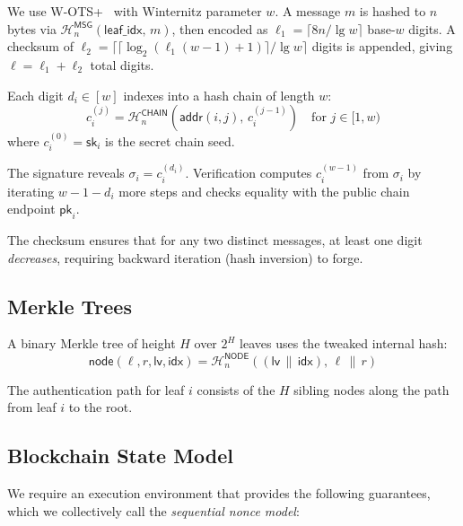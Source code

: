 \documentclass[11pt]{article}
\newcommand{\hash}{\mathcal{H}}
\newcommand{\concat}{\,\|\,}
\begin{document}
We use W-OTS+~\cite{wots} with Winternitz parameter $w$. A message $m$
is hashed to $n$ bytes via
$\hash_n^{\mathsf{MSG}}(\mathsf{leaf\_idx},\, m)$, then encoded as
$\ell_1 = \lceil 8n / \lg w
\rceil$ base-$w$ digits. A checksum of $\ell_2 = \lceil \lceil
\log_2(\ell_1(w-1) + 1) \rceil / \lg w \rceil$ digits is appended,
giving $\ell = \ell_1 + \ell_2$ total digits.

Each digit $d_i \in [w]$ indexes into a hash chain of length $w$:
\[
c_i^{(j)} = \hash_n^{\mathsf{CHAIN}}(\mathsf{addr}(i, j),\, c_i^{(j-1)})
\quad\text{for } j \in [1, w)
\]
where $c_i^{(0)} = \mathsf{sk}_i$ is the secret chain seed.

The signature reveals $\sigma_i = c_i^{(d_i)}$. Verification computes
$c_i^{(w-1)}$ from $\sigma_i$ by iterating $w - 1 - d_i$ more steps
and checks equality with the public chain endpoint $\mathsf{pk}_i$.

The checksum ensures that for any two distinct messages, at least one
digit \emph{decreases}, requiring backward iteration (hash inversion)
to forge.

\subsection{Merkle Trees}

A binary Merkle tree of height $H$ over $2^H$ leaves uses the tweaked
internal hash:
\[
\mathsf{node}(\ell, r, \mathsf{lv}, \mathsf{idx}) =
\hash_n^{\mathsf{NODE}}((\mathsf{lv} \concat \mathsf{idx}),\, \ell \concat r)
\]

The authentication path for leaf $i$ consists of the $H$ sibling nodes
along the path from leaf $i$ to the root.

\subsection{Blockchain State Model}

We require an execution environment that provides the following
guarantees, which we collectively call the \emph{sequential nonce
model}:
\end{document}
